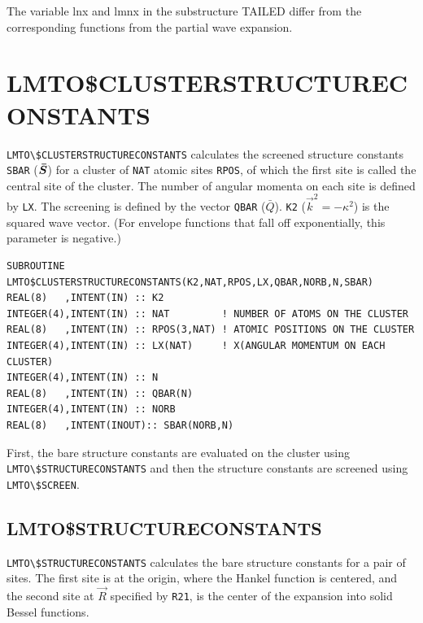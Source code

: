 \documentclass[11pt,a4paper]{report}
\begin{document}
The variable lnx and lmnx in the substructure TAILED differ from the
corresponding functions from the partial wave expansion.



\section{LMTO\$CLUSTERSTRUCTURECONSTANTS}
\verb|LMTO\$CLUSTERSTRUCTURECONSTANTS| calculates the screened
structure constants \verb|SBAR| ($\bm{\bar{S}}$) for a cluster of
\verb|NAT| atomic sites \verb|RPOS|, of which the first site is called
the central site of the cluster. The number of angular momenta on each
site is defined by \verb|LX|. The screening is defined by the vector
\verb|QBAR| ($\bar{Q}$). \verb|K2| ($\vec{k}^2=-\kappa^2$) is the
squared wave vector. (For envelope functions that fall off
exponentially, this parameter is negative.)

\begin{verbatim}
SUBROUTINE LMTO$CLUSTERSTRUCTURECONSTANTS(K2,NAT,RPOS,LX,QBAR,NORB,N,SBAR)
REAL(8)   ,INTENT(IN) :: K2          
INTEGER(4),INTENT(IN) :: NAT         ! NUMBER OF ATOMS ON THE CLUSTER
REAL(8)   ,INTENT(IN) :: RPOS(3,NAT) ! ATOMIC POSITIONS ON THE CLUSTER
INTEGER(4),INTENT(IN) :: LX(NAT)     ! X(ANGULAR MOMENTUM ON EACH CLUSTER)
INTEGER(4),INTENT(IN) :: N
REAL(8)   ,INTENT(IN) :: QBAR(N)
INTEGER(4),INTENT(IN) :: NORB
REAL(8)   ,INTENT(INOUT):: SBAR(NORB,N)
\end{verbatim}




First, the bare structure constants are evaluated on the cluster using
\verb|LMTO\$STRUCTURECONSTANTS| and then the structure constants are
screened using \verb|LMTO\$SCREEN|.

\subsection{LMTO\$STRUCTURECONSTANTS}
\verb|LMTO\$STRUCTURECONSTANTS| calculates the bare structure
constants for a pair of sites. The first site is at the origin, where
the Hankel function is centered, and the second site at $\vec{R}$
specified by \verb|R21|, is the center of the expansion into solid
Bessel functions.
\end{document}
